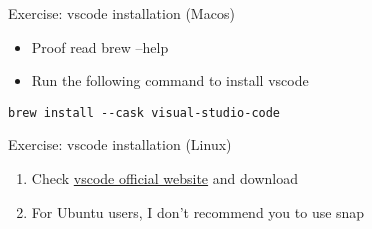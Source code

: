 \begin{frame}[fragile]{Exercise: vscode installation (Macos)}
\begin{itemize}
	\item Proof read brew --help
	\item Run the following command to install vscode
\end{itemize}

	\begin{verbatim}
brew install --cask visual-studio-code
	\end{verbatim}

\end{frame}

\begin{frame}[fragile]{Exercise: vscode installation (Linux)}
	\begin{enumerate}
		\item Check \href{https://code.visualstudio.com/docs/setup/linux}{vscode official website} and download
		\item For Ubuntu users, I don't recommend you to use snap
	\end{enumerate}
\end{frame}
